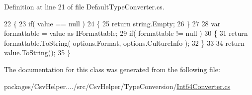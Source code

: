 Definition at line 21 of file Default\-Type\-Converter.\-cs.


\begin{DoxyCode}
22         \{
23             \textcolor{keywordflow}{if}( value == null )
24             \{
25                 \textcolor{keywordflow}{return} string.Empty;
26             \}
27 
28             var formattable = value as IFormattable;
29             \textcolor{keywordflow}{if}( formattable != null )
30             \{
31                 \textcolor{keywordflow}{return} formattable.ToString( options.Format, options.CultureInfo );
32             \}
33 
34             \textcolor{keywordflow}{return} value.ToString();
35         \}
\end{DoxyCode}


The documentation for this class was generated from the following file\-:\begin{DoxyCompactItemize}
\item 
packages/\-Csv\-Helper..../src/\-Csv\-Helper/\-Type\-Conversion/\hyperlink{a00274}{Int64\-Converter.\-cs}\end{DoxyCompactItemize}
